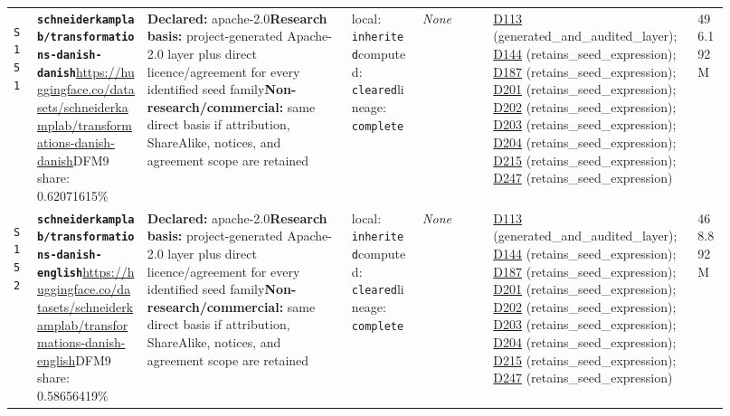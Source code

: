 \documentclass[9pt,a4paper]{article}
\newcommand{\srcid}[1]{\hypertarget{src:#1}{\texttt{#1}}}
\begin{document}
\begin{landscape}
\begin{longtable}{@{}L{0.03\linewidth}L{0.14\linewidth}L{0.26\linewidth}L{0.09\linewidth}L{0.09\linewidth}L{0.265\linewidth}L{0.045\linewidth}@{}}
\srcid{S151} & \textbf{\nolinkurl{schneiderkamplab/transformations-danish-danish}}\newline \url{https://huggingface.co/datasets/schneiderkamplab/transformations-danish-danish}\newline DFM9 share: 0.62071615\% & \textbf{Declared:} apache-2.0\newline \textbf{Research basis:} project-generated Apache-2.0 layer plus direct licence/agreement for every identified seed family\newline \textbf{Non-research/commercial:} same direct basis if attribution, ShareAlike, notices, and agreement scope are retained & local: \texttt{inherited}\newline computed: \texttt{cleared}\newline lineage: \texttt{complete} & \textit{None} & \hyperlink{dep:D113}{D113} (generated\_and\_audited\_layer); \hyperlink{dep:D144}{D144} (retains\_seed\_expression); \hyperlink{dep:D187}{D187} (retains\_seed\_expression); \hyperlink{dep:D201}{D201} (retains\_seed\_expression); \hyperlink{dep:D202}{D202} (retains\_seed\_expression); \hyperlink{dep:D203}{D203} (retains\_seed\_expression); \hyperlink{dep:D204}{D204} (retains\_seed\_expression); \hyperlink{dep:D215}{D215} (retains\_seed\_expression); \hyperlink{dep:D247}{D247} (retains\_seed\_expression) & 496.192M \\
\srcid{S152} & \textbf{\nolinkurl{schneiderkamplab/transformations-danish-english}}\newline \url{https://huggingface.co/datasets/schneiderkamplab/transformations-danish-english}\newline DFM9 share: 0.58656419\% & \textbf{Declared:} apache-2.0\newline \textbf{Research basis:} project-generated Apache-2.0 layer plus direct licence/agreement for every identified seed family\newline \textbf{Non-research/commercial:} same direct basis if attribution, ShareAlike, notices, and agreement scope are retained & local: \texttt{inherited}\newline computed: \texttt{cleared}\newline lineage: \texttt{complete} & \textit{None} & \hyperlink{dep:D113}{D113} (generated\_and\_audited\_layer); \hyperlink{dep:D144}{D144} (retains\_seed\_expression); \hyperlink{dep:D187}{D187} (retains\_seed\_expression); \hyperlink{dep:D201}{D201} (retains\_seed\_expression); \hyperlink{dep:D202}{D202} (retains\_seed\_expression); \hyperlink{dep:D203}{D203} (retains\_seed\_expression); \hyperlink{dep:D204}{D204} (retains\_seed\_expression); \hyperlink{dep:D215}{D215} (retains\_seed\_expression); \hyperlink{dep:D247}{D247} (retains\_seed\_expression) & 468.892M \\

\end{longtable}
\end{landscape}
\end{document}
